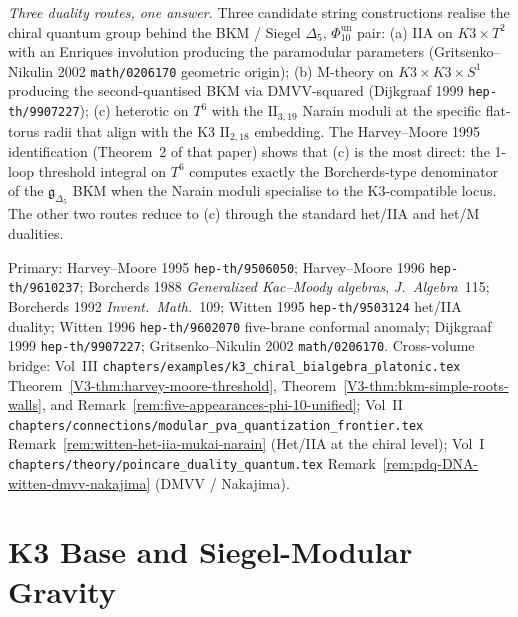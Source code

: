 \begin{remark}
\emph{Three duality routes, one answer.} Three candidate string
constructions realise the chiral quantum group behind the BKM /
Siegel $\Delta_{5}$, $\Phi_{10}^{\mathrm{un}}$ pair: (a) IIA on $K3 \times T^{2}$
with an Enriques involution producing the paramodular parameters
(Gritsenko--Nikulin 2002 \texttt{math/0206170} geometric origin);
(b) M-theory on $K3 \times K3 \times S^{1}$ producing the
second-quantised BKM via DMVV-squared (Dijkgraaf 1999
\texttt{hep-th/9907227}); (c) heterotic on $T^{6}$ with the
$\mathrm{II}_{3,19}$ Narain moduli at the specific flat-torus radii
that align with the K3 $\mathrm{II}_{2,18}$ embedding. The
Harvey--Moore 1995 identification (Theorem~2 of that paper) shows
that (c) is the most direct: the 1-loop threshold integral on
$T^{6}$ computes exactly the Borcherds-type denominator of the
$\mathfrak{g}_{\Delta_{5}}$ BKM when the Narain moduli specialise to
the K3-compatible locus. The other two routes reduce to (c) through
the standard het/IIA and het/M dualities.

Primary: Harvey--Moore 1995 \texttt{hep-th/9506050};
Harvey--Moore 1996 \texttt{hep-th/9610237};
Borcherds 1988 \emph{Generalized Kac--Moody algebras},
\emph{J.\ Algebra}~115; Borcherds 1992 \emph{Invent.\ Math.}~109;
Witten 1995 \texttt{hep-th/9503124} het/IIA duality;
Witten 1996 \texttt{hep-th/9602070} five-brane conformal anomaly;
Dijkgraaf 1999 \texttt{hep-th/9907227};
Gritsenko--Nikulin 2002 \texttt{math/0206170}.
Cross-volume bridge: Vol~III
\texttt{chapters/examples/k3\_chiral\_bialgebra\_platonic.tex}
Theorem~\ref*{V3-thm:harvey-moore-threshold},
Theorem~\ref*{V3-thm:bkm-simple-roots-walls}, and
Remark~\ref*{rem:five-appearances-phi-10-unified}; Vol~II
\texttt{chapters/connections/modular\_pva\_quantization\_frontier.tex}
Remark~\ref*{rem:witten-het-iia-mukai-narain} (Het/IIA at the chiral
level); Vol~I
\texttt{chapters/theory/poincare\_duality\_quantum.tex}
Remark~\ref*{rem:pdq-DNA-witten-dmvv-nakajima} (DMVV / Nakajima).
\end{remark}

\section{K3 Base and Siegel-Modular Gravity}
\label{sec:3dgrav-saturation}

